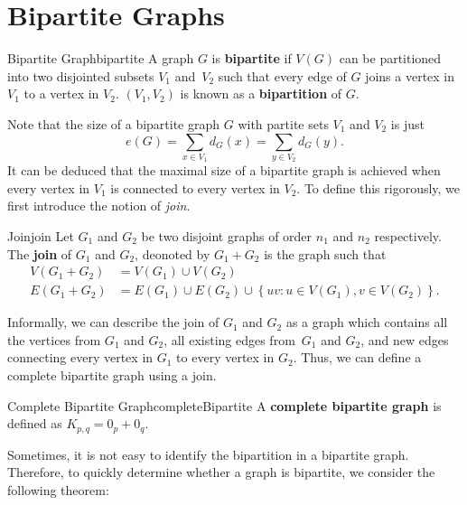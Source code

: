 \documentclass[math]{amznotes}
\theoremstyle{remark}
\newcommand{\0}{\mathbf{0}}
\newcommand{\1}{\mathbf{1}}
\begin{document}
\section{Bipartite Graphs}
\begin{dfnbox}{Bipartite Graph}{bipartite}
    A graph $G$ is {\color{red} \textbf{bipartite}} if $V(G)$ can be partitioned into two disjointed subsets $V_1$ and~$V_2$ such that every edge of $G$ joins a vertex in $V_1$ to a vertex in $V_2$. $(V_1, V_2)$ is known as a {\color{red} \textbf{bipartition}} of $G$.
\end{dfnbox}
Note that the size of a bipartite graph $G$ with partite sets $V_1$ and $V_2$ is just
\begin{equation*}
    e(G) = \sum_{x \in V_1}d_G(x) = \sum_{y \in V_2}d_G(y).
\end{equation*}
It can be deduced that the maximal size of a bipartite graph is achieved when every vertex in $V_1$ is connected to every vertex in $V_2$. To define this rigorously, we first introduce the notion of \textit{join}.
\begin{dfnbox}{Join}{join}
    Let $G_1$ and $G_2$ be two disjoint graphs of order $n_1$ and $n_2$ respectively. The {\color{red} \textbf{join}} of $G_1$ and $G_2$, deonoted by $G_1 + G_2$ is the graph such that
    \begin{align*}
        V(G_1 + G_2) & = V(G_1) \cup V(G_2) \\
        E(G_1 + G_2) & = E(G_1) \cup E(G_2) \cup \left\{uv \colon u \in V(G_1), v \in V(G_2)\right\}.
    \end{align*}
\end{dfnbox}
Informally, we can describe the join of $G_1$ and $G_2$ as a graph which contains all the vertices from $G_1$ and $G_2$, all existing edges from~$G_1$ and $G_2$, and new edges connecting every vertex in $G_1$ to every vertex in $G_2$. Thus, we can define a complete bipartite graph using a join.
\begin{dfnbox}{Complete Bipartite Graph}{completeBipartite}
    A {\color{red} \textbf{complete bipartite graph}} is defined as $K_{p, q} = 0_p + 0_q$.
\end{dfnbox}
Sometimes, it is not easy to identify the bipartition in a bipartite graph. Therefore, to quickly determine whether a graph is bipartite, we consider the following theorem:
\end{document}
